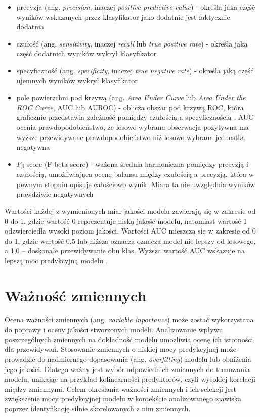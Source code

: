 \documentclass{amuthesis}
\begin{document}
\begin{itemize}
\item
  precyzja (ang. \emph{precision}, inaczej \emph{positive predictive
  value}) - określa jaka część wyników wskazanych przez klasyfikator
  jako dodatnie jest faktycznie dodatnia
  \autocite{jaworski_2013_perfomance_measures}
\item
  czułość (ang. \emph{sensitivity}, inaczej \emph{recall} lub \emph{true
  positive rate}) - określa jaką część dodatnich wyników wykrył
  klasyfikator \autocite{jaworski_2013_perfomance_measures}
\item
  specyficzność (ang. \emph{specificity}, inaczej \emph{true negative
  rate}) - określa jaką część ujemnych wyników wykrył klasyfikator
  \autocite{jaworski_2013_perfomance_measures}
\item
  pole powierzchni pod krzywą (ang. \emph{Area Under Curve} lub
  \emph{Area Under the ROC Curve}, AUC lub AUROC) - oblicza obszar pod
  krzywą ROC, która graficznie przedstawia zależność pomiędzy czułością
  a specyficznością \autocite{jaworski_2013_perfomance_measures}. AUC
  ocenia prawdopodobieństwo, że losowo wybrana obserwacja pozytywna ma
  wyższe przewidywane prawdopodobieństwo niż losowo wybrana jednostka
  negatywna \autocite{R-mlr3measures}
\item
  \(F_{\beta}\) score (F-beta score) - ważona średnia harmoniczna
  pomiędzy precyzją i czułością, umożliwiająca ocenę balansu między
  czułością a precyzją, która w pewnym stopniu opisuje całościowo wynik.
  Miara ta nie uwzględnia wyników prawdziwie negatywnych
  \autocite{zygierewicz_2021_ml}
\end{itemize}

Wartości każdej z wymienionych miar jakości modelu zawierają się w
zakresie od 0 do 1, gdzie wartość 0 reprezentuje niską jakość modelu,
natomiast wartość 1 odzwierciedla wysoki poziom jakości. Wartości AUC
mieszczą się w zakresie od 0 do 1, gdzie wartość 0,5 lub niższa oznacza
oznacza model nie lepszy od losowego, a 1,0 -- doskonałe przewidywanie
obu klas. Wyższa wartość AUC wskazuje na lepszą moc predykcyjną modelu
\autocite{lovelace_2019_geocomputation}.

\hypertarget{waux17cnoux15bux107-zmiennych}{%
\section{Ważność zmiennych}\label{waux17cnoux15bux107-zmiennych}}

Ocena ważności zmiennych (ang. \emph{variable inportance}) może zostać
wykorzystana do poprawy i oceny jakości stworzonych modeli. Analizowanie
wpływu poszczególnych zmiennych na dokładność modelu umożliwia ocenę ich
istotności dla przewidywań. Stosowanie zmiennych o niskiej mocy
predykcyjnej może prowadzić do nadmiernego dopasowania (ang.
\emph{overfitting}) modelu lub obniżenia jego jakości. Dlatego ważny
jest wybór odpowiednich zmiennych do trenowania modelu, unikając na
przykład kolinearności predyktorów, czyli wysokiej korelacji między
zmiennymi. Celem określania ważności zmiennych i ich selekcji jest
zwiększenie mocy predykcyjnej modelu w kontekście analizowanego zjawiska
poprzez identyfikację silnie skorelowanych z nim zmiennych.
\end{document}
